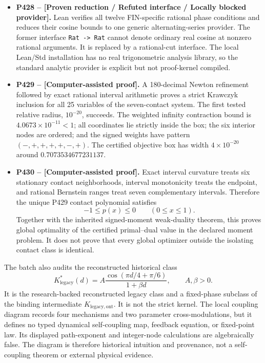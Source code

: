 \documentclass[11pt,a4paper]{article}
\newcommand{\status}[1]{\textbf{[#1]}}
\newcommand{\Klegacy}{K_{\mathrm{legacy,ont}}}
\newcommand{\Kstar}{K^*_{\mathrm{legacy}}}
\begin{document}
\begin{itemize}
\item \textbf{P428 -- \status{Proven reduction / Refuted interface / Locally
blocked provider}.} Lean verifies all twelve FIN-specific rational phase
conditions and reduces their cosine bounds to one generic alternating-series
provider. The former interface \texttt{Rat -> Rat} cannot denote ordinary real
cosine at nonzero rational arguments. It is replaced by a rational-cut
interface. The local Lean/Std installation has no real trigonometric analysis
library, so the standard analytic provider is explicit but not proof-kernel
compiled.

\item \textbf{P429 -- \status{Computer-assisted proof}.} A 180-decimal Newton
refinement followed by exact rational interval arithmetic proves a strict
Krawczyk inclusion for all 25 variables of the seven-contact system. The first
tested relative radius, $10^{-20}$, succeeds. The weighted infinity contraction
bound is $4.0673\times10^{-11}<1$; all coordinates lie strictly inside the
box; the six interior nodes are ordered; and the signed weights have pattern
$(-,+,+,+,+,-,+)$. The certified objective box has width $4\times10^{-20}$
around $0.7073534677231137$.

\item \textbf{P430 -- \status{Computer-assisted proof}.} Exact interval
curvature treats six stationary contact neighborhoods, interval monotonicity
treats the endpoint, and rational Bernstein ranges treat seven complementary
intervals. Therefore the unique P429 contact polynomial satisfies
\[
-1\le p(x)\le0\qquad(0\le x\le1).
\]
Together with the inherited signed-moment weak-duality theorem, this proves
global optimality of the certified primal--dual value in the declared moment
problem. It does not prove that every global optimizer outside the isolating
contact class is identical.
\end{itemize}

The batch also audits the reconstructed historical class
\[
\Kstar(d)=A\frac{\cos(\pi d/4+\pi/6)}{1+\beta d},\qquad A,\beta>0.
\]
It is the research-backed reconstructed legacy class and a fixed-phase
subclass of the binding intermediate $\Klegacy$. It is not the strict kernel.
The local coupling diagram records four mechanisms and two parameter
cross-modulations, but it defines no typed dynamical self-coupling map,
feedback equation, or fixed-point law. Its displayed path-exponent and
integer-node calculations are algebraically false. The diagram is therefore
historical intuition and provenance, not a self-coupling theorem or external
physical evidence.
\end{document}
